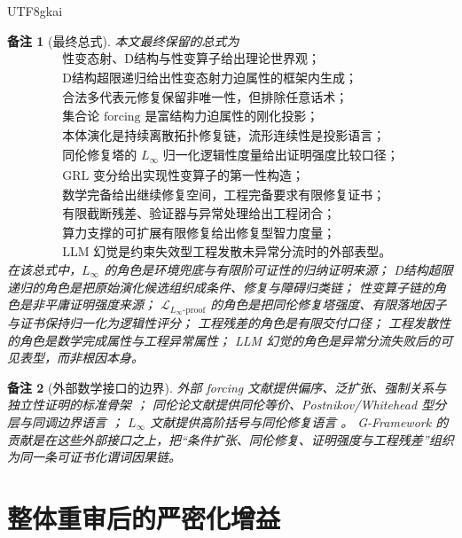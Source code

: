 \documentclass[12pt]{article}
\newtheorem{remark}{备注}[section]
\newcommand{\GFramework}{\textsf{G-Framework}}
\newcommand{\Linfty}{\ensuremath{L_\infty}}
\begin{document}
\begin{CJK*}{UTF8}{gkai}
\begin{remark}[最终总式]
本文最终保留的总式为
\[
\boxed{
\begin{gathered}
\text{性变态射、D结构与性变算子给出理论世界观；}\\
\text{D结构超限递归给出性变态射力迫属性的框架内生成；}\\
\text{合法多代表元修复保留非唯一性，但排除任意话术；}\\
\text{集合论 forcing 是富结构力迫属性的刚化投影；}\\
\text{本体演化是持续离散拓扑修复链，流形连续性是投影语言；}\\
\text{同伦修复塔的 }\Linfty\text{ 归一化逻辑性度量给出证明强度比较口径；}\\
\text{GRL 变分给出实现性变算子的第一性构造；}\\
\text{数学完备给出继续修复空间，工程完备要求有限修复证书；}\\
\text{有限截断残差、验证器与异常处理给出工程闭合；}\\
\text{算力支撑的可扩展有限修复给出修复型智力度量；}\\
\text{LLM 幻觉是约束失效型工程发散未异常分流时的外部表型。}
\end{gathered}}
\]
在该总式中，\Linfty{} 的角色是环境兜底与有限阶可证性的归纳证明来源；
D结构超限递归的角色是把原始演化候选组织成条件、修复与障碍归类链；
性变算子链的角色是非平庸证明强度来源；
\(\mathcal L_{\Linfty\text{-}\mathrm{proof}}\) 的角色是把同伦修复塔强度、有限落地因子与证书保持归一化为逻辑性评分；
工程残差的角色是有限交付口径；
工程发散性的角色是数学完成属性与工程异常属性；
LLM 幻觉的角色是异常分流失败后的可见表型，而非根因本身。
\end{remark}

\begin{remark}[外部数学接口的边界]
外部 forcing 文献提供偏序、泛扩张、强制关系与独立性证明的标准骨架 \cite{Cohen1963,Jech2003,SEPSetTheory,EOMForcing}；
同伦论文献提供同伦等价、Postnikov/Whitehead 型分层与同调边界语言 \cite{Hatcher2002AT,Whitehead1978Elements,Weibel1994HomologicalAlgebra}；
\Linfty{} 文献提供高阶括号与同伦修复语言 \cite{LadaStasheff1993,LadaMarkl1995,LodayVallette2012}。
\GFramework{} 的贡献是在这些外部接口之上，把“条件扩张、同伦修复、证明强度与工程残差”组织为同一条可证书化谓词因果链。
\end{remark}

\clearpage

\section{整体重审后的严密化增益}
\label{sec:tex50-reviewed-gain}


\end{CJK*}
\end{document}
